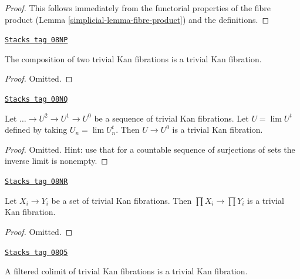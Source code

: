 \begin{proof}

This follows immediately from the functorial properties of the fibre
product (Lemma \ref{simplicial-lemma-fibre-product}) and the definitions.
\end{proof}

\begin{lemma}
\label{simplicial-lemma-trivial-kan-composition}
\href{https://stacks.math.columbia.edu/tag/08NP}{\texttt{Stacks tag 08NP}}

The composition of two trivial Kan fibrations is a trivial Kan fibration.
\end{lemma}

\begin{proof}
Omitted.
\end{proof}

\begin{lemma}
\label{simplicial-lemma-limit-trivial-kan}
\href{https://stacks.math.columbia.edu/tag/08NQ}{\texttt{Stacks tag 08NQ}}

Let $\ldots \to U^2 \to U^1 \to U^0$ be a sequence of trivial Kan
fibrations. Let $U = \lim U^t$ defined by taking $U_n = \lim U_n^t$.
Then $U \to U^0$ is a trivial Kan fibration.
\end{lemma}

\begin{proof}
Omitted. Hint: use that for a countable sequence of surjections of sets
the inverse limit is nonempty.
\end{proof}

\begin{lemma}
\label{simplicial-lemma-product-trivial-kan}
\href{https://stacks.math.columbia.edu/tag/08NR}{\texttt{Stacks tag 08NR}}


Let $X_i \to Y_i$ be a set of trivial Kan fibrations. Then
$\prod X_i \to \prod Y_i$ is a trivial Kan fibration.
\end{lemma}

\begin{proof}
Omitted.
\end{proof}

\begin{lemma}
\label{simplicial-lemma-filtered-colimit-trivial-kan}
\href{https://stacks.math.columbia.edu/tag/08Q5}{\texttt{Stacks tag 08Q5}}

A filtered colimit of trivial Kan fibrations is a trivial Kan fibration.
\end{lemma}

